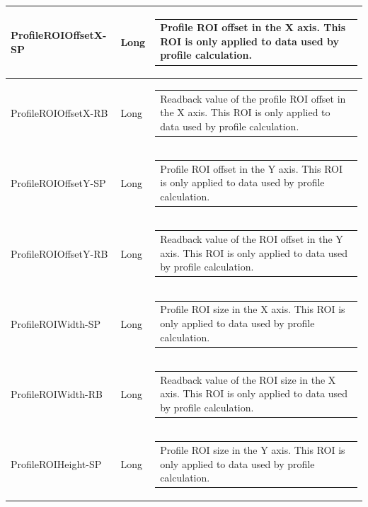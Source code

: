 \documentclass[openany]{article}
\begin{document}
\begin{longtable}{| m{3.0cm} m{4.5cm}  m{7.0cm} |}
        ProfileROIOffsetX-SP & Long & \begin{tabular}{@{}m{6cm}@{}}
                Profile ROI offset in the X axis. This ROI is only applied to data used by profile calculation.
            \end{tabular} \\ \hline
        ProfileROIOffsetX-RB & Long & \begin{tabular}{@{}m{6cm}@{}}
                Readback value of the profile ROI offset in the X axis. This ROI is only applied to data used by profile calculation.
            \end{tabular} \hypertarget{pv:profile-roi-offset-y}{}\\ \hline
        ProfileROIOffsetY-SP & Long & \begin{tabular}{@{}m{6cm}@{}}
                Profile ROI offset in the Y axis. This ROI is only applied to data used by profile calculation.
            \end{tabular} \\ \hline
        ProfileROIOffsetY-RB & Long & \begin{tabular}{@{}m{6cm}@{}}
                Readback value of the ROI offset in the Y axis. This ROI is only applied to data used by profile calculation.
            \end{tabular} \hypertarget{pv:profile-roi-width}{}\\ \hline
        ProfileROIWidth-SP & Long & \begin{tabular}{@{}m{6cm}@{}}
                Profile ROI size in the X axis. This ROI is only applied to data used by profile calculation.
            \end{tabular} \\ \hline
        ProfileROIWidth-RB & Long & \begin{tabular}{@{}m{6cm}@{}}
                Readback value of the ROI size in the X axis. This ROI is only applied to data used by profile calculation.
            \end{tabular} \hypertarget{pv:profile-roi-height}{}\\ \hline
        ProfileROIHeight-SP & Long & \begin{tabular}{@{}m{6cm}@{}}
                Profile ROI size in the Y axis. This ROI is only applied to data used by profile calculation.
            \end{tabular} \\ \hline

\end{longtable}
\end{document}
